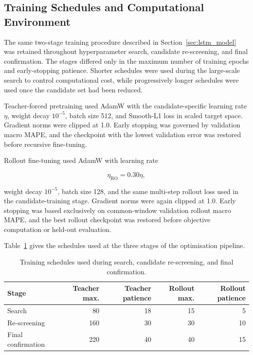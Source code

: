 \documentclass[a4paper,fleqn]{cas-sc}
\begin{document}

\subsection{Training Schedules and Computational Environment}
\label{sec:training_environment}

The same two-stage training procedure described in Section~\ref{sec:lstm_model} was retained throughout hyperparameter search, candidate re-screening, and final confirmation. The stages differed only in the maximum number of training epochs and early-stopping patience. Shorter schedules were used during the large-scale search to control computational cost, while progressively longer schedules were used once the candidate set had been reduced.

Teacher-forced pretraining used AdamW \cite{loshchilov2019adamw} with the candidate-specific learning rate $\eta$, weight decay $10^{-5}$, batch size 512, and Smooth-L1 loss in scaled target space. Gradient norms were clipped at 1.0. Early stopping was governed by validation macro MAPE, and the checkpoint with the lowest validation error was restored before recursive fine-tuning.

Rollout fine-tuning used AdamW with learning rate

\begin{equation}
\eta_{\mathrm{RO}} = 0.30\eta,
\label{eq:rollout_learning_rate}
\end{equation}

weight decay $10^{-5}$, batch size 128, and the same multi-step rollout loss used in the candidate-training stage. Gradient norms were again clipped at 1.0. Early stopping was based exclusively on common-window validation rollout macro MAPE, and the best rollout checkpoint was restored before objective computation or held-out evaluation.

Table~\ref{tab:training_schedules} gives the schedules used at the three stages of the optimisation pipeline.

\begin{table}[htbp]
\centering
\caption{Training schedules used during search, candidate re-screening, and final confirmation.}
\label{tab:training_schedules}
\begin{tabular}{lrrrr}
\toprule
\textbf{Stage} &
\textbf{Teacher max.} &
\textbf{Teacher patience} &
\textbf{Rollout max.} &
\textbf{Rollout patience} \\
\midrule
Search &
80 &
18 &
15 &
5 \\

Re-screening &
160 &
30 &
30 &
10 \\

Final confirmation &
220 &
40 &
40 &
15 \\
\bottomrule
\end{tabular}
\end{table}
\end{document}
